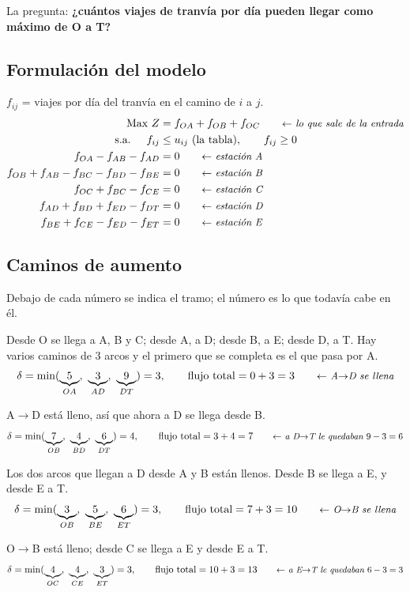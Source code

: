 \documentclass[11pt,a4paper]{article}
\begin{document}
La pregunta: \textbf{¿cuántos viajes de tranvía por día pueden llegar como máximo de O a T?}

\subsection*{Formulación del modelo}
$f_{ij}$ = viajes por día del tranvía en el camino de $i$ a $j$.
\[
\begin{aligned}
\text{Max } Z &= f_{OA} + f_{OB} + f_{OC} \nota{lo que sale de la entrada}\\
\text{s.a. } \quad f_{ij} &\le u_{ij} \ \text{(la tabla)}, \qquad f_{ij} \ge 0\\
f_{OA} - f_{AB} - f_{AD} &= 0 \nota{estación A}\\
f_{OB} + f_{AB} - f_{BC} - f_{BD} - f_{BE} &= 0 \nota{estación B}\\
f_{OC} + f_{BC} - f_{CE} &= 0 \nota{estación C}\\
f_{AD} + f_{BD} + f_{ED} - f_{DT} &= 0 \nota{estación D}\\
f_{BE} + f_{CE} - f_{ED} - f_{ET} &= 0 \nota{estación E}
\end{aligned}
\]

\subsection*{Caminos de aumento}
Debajo de cada número se indica el tramo; el número es lo que todavía cabe en él.

Desde O se llega a A, B y C; desde A, a D; desde B, a E; desde D, a T. Hay varios caminos de 3 arcos y el primero
que se completa es el que pasa por A.
\[
\delta = \min(\underbrace{5}_{OA},\ \underbrace{3}_{AD},\ \underbrace{9}_{DT}) = 3,
\qquad \text{flujo total} = 0 + 3 = 3 \nota{A$\to$D se llena}
\]

A$\to$D está lleno, así que ahora a D se llega desde B.
\[
\delta = \min(\underbrace{7}_{OB},\ \underbrace{4}_{BD},\ \underbrace{6}_{DT}) = 4,
\qquad \text{flujo total} = 3 + 4 = 7 \nota{a D$\to$T le quedaban $9 - 3 = 6$}
\]

Los dos arcos que llegan a D desde A y B están llenos. Desde B se llega a E, y desde E a T.
\[
\delta = \min(\underbrace{3}_{OB},\ \underbrace{5}_{BE},\ \underbrace{6}_{ET}) = 3,
\qquad \text{flujo total} = 7 + 3 = 10 \nota{O$\to$B se llena}
\]

O$\to$B está lleno; desde C se llega a E y desde E a T.
\[
\delta = \min(\underbrace{4}_{OC},\ \underbrace{4}_{CE},\ \underbrace{3}_{ET}) = 3,
\qquad \text{flujo total} = 10 + 3 = 13 \nota{a E$\to$T le quedaban $6 - 3 = 3$}
\]
\end{document}

